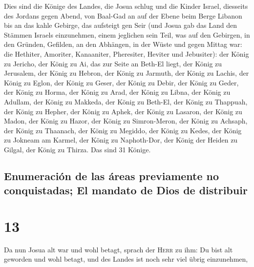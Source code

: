 Dies sind die Könige des Landes, die Josua schlug und die
Kinder Israel, diesseits des Jordans gegen Abend, von Baal-Gad an auf
der Ebene beim Berge Libanon bis an das kahle Gebirge, das aufsteigt gen
Seir (und Josua gab das Land den Stämmen Israels einzunehmen, einem
jeglichen sein Teil,  was auf den Gebirgen, in den
Gründen, Gefilden, an den Abhängen, in der Wüste und gegen Mittag war:
die Hethiter, Amoriter, Kanaaniter, Pheresiter, Heviter und Jebusiter):
 der König zu Jericho, der König zu Ai, das zur Seite an
Beth-El liegt,  der König zu Jerusalem, der König zu
Hebron,  der König zu Jarmuth, der König zu Lachis,
 der König zu Eglon, der König zu Geser, 
der König zu Debir, der König zu Geder,  der König zu
Horma, der König zu Arad,  der König zu Libna, der König
zu Adullam,  der König zu Makkeda, der König zu Beth-El,
 der König zu Thappuah, der König zu Hepher,
 der König zu Aphek, der König zu Lasaron,
 der König zu Madon, der König zu Hazor, 
der König zu Simron-Meron, der König zu Achsaph,  der
König zu Thaanach, der König zu Megiddo,  der König zu
Kedes, der König zu Jokneam am Karmel,  der König zu
Naphoth-Dor, der König der Heiden zu Gilgal,  der König
zu Thirza. Das sind 31 Könige.

\hypertarget{enumeraciuxf3n-de-las-uxe1reas-previamente-no-conquistadas-el-mandato-de-dios-de-distribuir}{%
\subsection{Enumeración de las áreas previamente no conquistadas; El
mandato de Dios de
distribuir}\label{enumeraciuxf3n-de-las-uxe1reas-previamente-no-conquistadas-el-mandato-de-dios-de-distribuir}}

\hypertarget{section-12}{%
\section{13}\label{section-12}}

 Da nun Josua alt war und wohl betagt, sprach der
\textsc{Herr} zu ihm: Du bist alt geworden und wohl betagt, und des
Landes ist noch sehr viel übrig einzunehmen,

